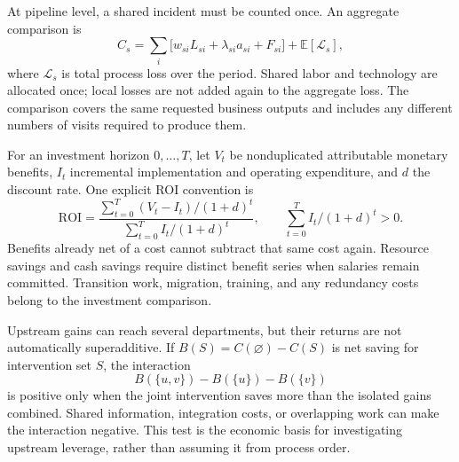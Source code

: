 At pipeline level, a shared incident must be counted once. An aggregate comparison is
\begin{equation}
C_s=\sum_i\bigl[w_{si}L_{si}+\lambda_{si}a_{si}+F_{si}\bigr]+\mathbb{E}[\mathcal{L}_s], \label{eq:pipeline}
\end{equation}
where $\mathcal{L}_s$ is total process loss over the period. Shared labor and technology are
allocated once; local losses are not added again to the aggregate loss. The comparison covers the
same requested business outputs and includes any different numbers of visits required to produce them.

For an investment horizon $0,\dots,T$, let $V_t$ be nonduplicated attributable monetary benefits,
$I_t$ incremental implementation and operating expenditure, and $d$ the discount rate. One explicit
ROI convention is
\begin{equation}
\mathrm{ROI}=\frac{\sum_{t=0}^{T}(V_t-I_t)/(1+d)^t}{\sum_{t=0}^{T}I_t/(1+d)^t},
\qquad \sum_{t=0}^{T}I_t/(1+d)^t>0. \label{eq:roi}
\end{equation}
Benefits already net of a cost cannot subtract that same cost again. Resource savings and cash
savings require distinct benefit series when salaries remain committed. Transition work, migration,
training, and any redundancy costs belong to the investment comparison.

Upstream gains can reach several departments, but their returns are not automatically superadditive.
If $B(S)=C(\varnothing)-C(S)$ is net saving for intervention set $S$, the interaction
\begin{equation}
B(\{u,v\})-B(\{u\})-B(\{v\}) \label{eq:interaction}
\end{equation}
is positive only when the joint intervention saves more than the isolated gains combined. Shared
information, integration costs, or overlapping work can make the interaction negative. This test is
the economic basis for investigating upstream leverage, rather than assuming it from process order.
